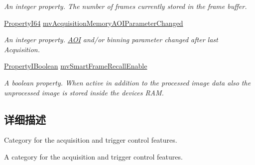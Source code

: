 \begin{DoxyCompactItemize}
\begin{DoxyCompactList}\small\item\em An integer property. The number of frames currently stored in the frame buffer. \end{DoxyCompactList}\item 
\hyperlink{group___common_interface_ga81749b2696755513663492664a18a893}{Property\+I64} \hyperlink{classmv_i_m_p_a_c_t_1_1acquire_1_1_gen_i_cam_1_1_acquisition_control_aa56de2ea0f33f1de69f8a3594c57d8c0}{mv\+Acquisition\+Memory\+A\+O\+I\+Parameter\+Changed}
\begin{DoxyCompactList}\small\item\em An integer property. \hyperlink{struct_a_o_i}{A\+O\+I} and/or binning parameter changed after last Acquisition. \end{DoxyCompactList}\item 
\hyperlink{group___common_interface_ga44f9437e24b21b6c93da9039ec6786aa}{Property\+I\+Boolean} \hyperlink{classmv_i_m_p_a_c_t_1_1acquire_1_1_gen_i_cam_1_1_acquisition_control_aeb86056e3eb76d5c80c4048ac9ba10d5}{mv\+Smart\+Frame\+Recall\+Enable}
\begin{DoxyCompactList}\small\item\em A boolean property. When active in addition to the processed image data also the unprocessed image is stored inside the devices R\+A\+M. \end{DoxyCompactList}\end{DoxyCompactItemize}


\subsection{详细描述}
Category for the acquisition and trigger control features. 

A category for the acquisition and trigger control features. 

